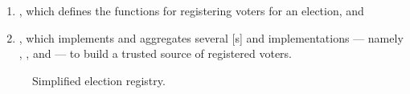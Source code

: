 \begin{enumerate}
  \item {}, which defines the functions for registering
    voters for an election, and
  \item {}, which implements and
    aggregates several [s] and  implementations
    --- namely , , and
     --- to build a trusted source of registered
    voters.
\end{enumerate}

\begin{figure}[H]
  \centering
  \caption{Simplified election registry.}\label{fig:registry}
\end{figure}




